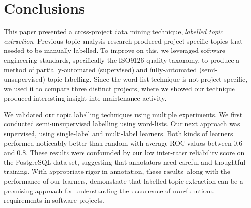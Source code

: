 \documentclass[smallextended]{svjour3}       %
\begin{document}
\section{Conclusions}
This paper presented a cross-project data mining technique,
\emph{labelled topic extraction}. %
Previous topic analysis research produced project-specific
topics that needed to be manually labelled.
To improve on this, we leveraged software engineering standards,
specifically the ISO9126 quality taxonomy, to produce a method of partially-automated (supervised) and fully-automated (semi-unsupervised) topic labelling.
Since the word-list technique is not project-specific, we used it to compare three distinct projects, where we showed our technique produced interesting
insight into maintenance activity. %


We validated our topic labelling techniques using multiple experiments. %
We first conducted semi-unsupervised labelling using word-lists. 
Our next approach was supervised, using single-label and multi-label learners. 
Both kinds of learners performed noticeably better than random with average
ROC values between $0.6$ and $0.8$. 
These results were confounded by our low inter-rater reliability score
on the PostgreSQL data-set, suggesting that annotators need careful
and thoughtful training.
With appropriate rigor in annotation, these results, along with the performance of our learners,
demonstrate that labelled topic extraction can be
a promising approach for understanding the occurrence of non-functional requirements in software projects. 
\end{document}
